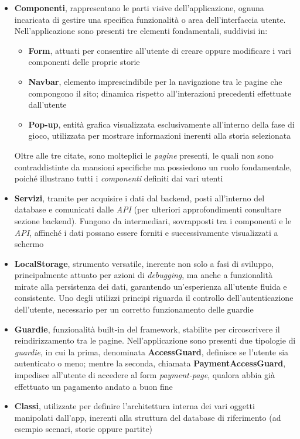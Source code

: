\documentclass{article}
\begin{document}
\begin{itemize}[label = {-}]
    \itemsep0em
    \item \textbf{Componenti}, rappresentano le parti visive dell'applicazione, ognuna incaricata di gestire una specifica funzionalità o area dell'interfaccia utente. Nell'applicazione sono presenti tre elementi fondamentali, suddivisi in: 
    \begin{itemize}[label = {-}]
        \itemsep0em
        \item \textbf{Form}, attuati per consentire all'utente di creare oppure modificare i vari componenti delle proprie storie
        \item \textbf{Navbar}, elemento imprescindibile per la navigazione tra le pagine che compongono il sito; dinamica rispetto all'interazioni precedenti effettuate dall'utente
        \item \textbf{Pop-up}, entità grafica visualizzata esclusivamente all'interno della fase di gioco, utilizzata per mostrare informazioni inerenti alla storia selezionata
    \end{itemize}
    Oltre alle tre citate, sono molteplici le \textit{pagine} presenti, le quali non sono contraddistinte da mansioni specifiche ma possiedono un ruolo fondamentale, poiché illustrano tutti i \textit{componenti} definiti dai vari utenti
    \item \textbf{Servizi}, tramite per acquisire i dati dal backend, posti all'interno del database e comunicati dalle \textit{API} (per ulteriori approfondimenti consultare sezione backend). Fungono da intermediari, sovrapposti tra i componenti e le \textit{API}, affinché i dati possano essere forniti e successivamente visualizzati a schermo
    \item \textbf{LocalStorage}, strumento versatile, inerente non solo a fasi di sviluppo, principalmente attuato per azioni di \textit{debugging}, ma anche a funzionalità mirate alla persistenza dei dati, garantendo un'esperienza all’utente fluida e consistente. Uno degli utilizzi principi riguarda il controllo dell'autenticazione dell'utente, necessario per un corretto funzionamento delle guardie
    \item \textbf{Guardie}, funzionalità built-in del framework, stabilite per circoscrivere il reindirizzamento tra le pagine. Nell'applicazione sono presenti due tipologie di \textit{guardie}, in cui la prima, denominata \textbf{AccessGuard}, definisce se l'utente sia autenticato o meno; mentre la seconda, chiamata \textbf{PaymentAccessGuard}, impedisce all'utente di accedere al form \textit{payment-page}, qualora abbia già effettuato un pagamento andato a buon fine
    \item \textbf{Classi}, utilizzate per definire l'architettura interna dei vari oggetti manipolati dall'app, inerenti alla struttura del database di riferimento (ad esempio scenari, storie oppure partite)
\end{itemize}
\end{document}
